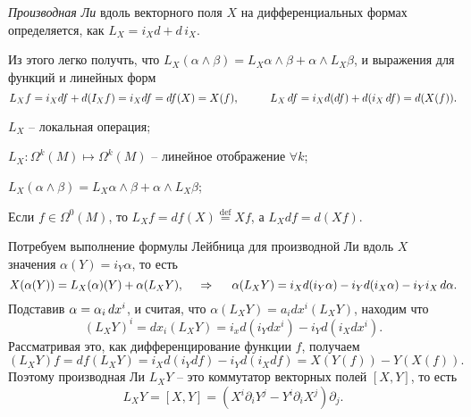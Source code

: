 \begin{to_def}
    \textit{Производная Ли} вдоль векторного поля $X$ на дифференциальных формах определяется, как $ L_X = i_X d + d \, i_X$.
\end{to_def}

Из этого легко получть, что $L_X (\alpha \wedge \beta) = L_X \alpha \wedge \beta + \alpha \wedge L_X \beta$, и выражения для функций и линейных форм
\begin{equation*}
    L_X f = i_X d f + d(I_X f) = i_X d f = df(X) = X(f), \hspace{1cm} L_X \, d f = i_X d (df) + d (i_X \, d f) = d(X(f)).
\end{equation*}

\begin{enumerate*}
    \item $L_X$ -- локальная операция;
    \item $L_X \colon \Omega^k (M) \mapsto \Omega^k(M)$ -- линейное отображение $\forall k$;
    \item $L_X (\alpha \wedge \beta) = L_X \alpha \wedge \beta + \alpha \wedge L_X \beta$;
    \item Если $f \in \Omega^0 (M)$, то $L_X f = df(X) \overset{\mathrm{def}}{=} Xf$, а $L_X df = d(Xf)$.
\end{enumerate*}


\begin{to_def}
    Потребуем выполнение формулы Лейбница для производной Ли вдоль $X$ значения $\alpha(Y) = i_Y \alpha$, то есть
    \begin{equation*}
        X(\alpha(Y)) = L_X(\alpha)(Y) + \alpha(L_X Y),
        \hspace{0.5cm} \Rightarrow \hspace{0.5cm} 
        \alpha(L_X Y) = i_X d(i_Y \alpha) - i_Y d (i_X \alpha) - i_Y i_X \, d \alpha.
    \end{equation*} 
    Подставив $\alpha = \alpha_i \, d x^i$, и считая, что $\alpha(L_X Y) = a_i dx^i (L_X Y)$, находим что
    \begin{equation*}
        (L_X Y)^i = dx_i(L_X Y) = i_x d(i_Y dx^i) - i_Y d(i_X dx^i).
    \end{equation*}    
    Рассматривая это, как дифференцирование функции $f$, получаем
\begin{equation*}
    (L_X Y) f = df (L_X Y) = i_X d(i_Y df) - i_Y d(i_X df) =X(Y(f)) - Y(X(f)).
\end{equation*}
    Поэтому производная Ли $L_X Y$ -- это коммутатор векторных полей $[X, Y]$, то есть 
\begin{equation*}
    L_X Y = [X, Y] = (X^i \partial_i Y^j - Y^i \partial_i X^j) \partial_j.
\end{equation*}
\end{to_def}



